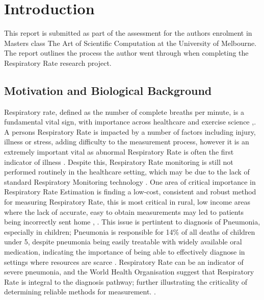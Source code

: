 \chapter{Introduction}\label{ch:introduction}

This report is submitted as part of the assessment for the authors enrolment in Masters class The Art of Scientific 
Computation at the University of Melbourne. The report outlines the process the author went through when 
completing the Respiratory Rate research project. 

\section{Motivation and Biological Background}
Respiratory rate, defined as the number of complete breaths per minute, is a fundamental 
vital sign, with importance across healthcare and exercise science \cite{ala2025respiratory_rate},\cite{nicolo2020importance}. 
A persons Respiratory Rate is impacted by a number of factors including injury, illness or stress, adding difficulty 
to the measurement process, however 
it is an extremely important vital as abnormal Respiratory Rate is often the first indicator 
of illness \cite{ala2025respiratory_rate}. Despite this, Respiratory Rate monitoring is still 
not performed routinely in the healthcare setting, which may be due to the lack of standard 
Respiratory Monitoring technology \cite{nicolo2020importance}. One area of critical importance 
in Respiratory Rate Estimation is finding a low-cost, consistent and robust method for measuring 
Respiratory Rate, this is most critical in rural, low income areas where the lack of accurate, easy 
to obtain measurements may led to patients being incorrectly sent home \cite{valerian2026respiratory}, \cite{nicolo2020importance}.
This issue is pertintent to diagnosis of Pneumonia, especially in children; Pneumonia is responsible for 14\% of all deaths of children 
under 5, despite pneumonia being  easily treatable with widely available oral medication, indicating the importance of being able to 
effectively diagnose in settings where resources are scarce \cite{who2022pneumonia}. Respiratory Rate can be an indicator of severe pneumonia, 
and the World Health Organisation suggest that Respiratory Rate is integral to the diagnosis pathway;
further illustrating the criticality of determining reliable methods for measurement. \cite{nicolo2020importance}.\\


